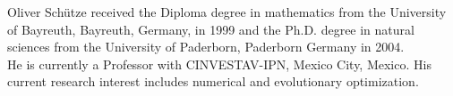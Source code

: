 \documentclass[journal]{IEEEtran}
\begin{document}
\begin{IEEEbiography}{Oliver Sch\"{u}tze}
received the Diploma degree in mathematics from the University of Bayreuth, Bayreuth, Germany, in 1999 and the Ph.D. degree in natural sciences from the University of Paderborn, Paderborn Germany in 2004.
\\
He is currently a Professor with CINVESTAV-IPN, Mexico City, Mexico.
%
His current research interest includes numerical and evolutionary optimization.
\end{IEEEbiography}









\end{document}
